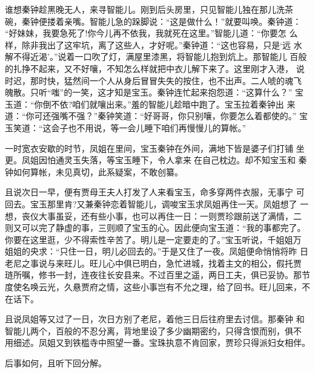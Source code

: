 谁想秦钟趁黑晚无人，来寻智能儿。刚到后头房里，只见智能儿独在那儿洗茶
碗，秦钟便搂着亲嘴。智能儿急的跺脚说：“这是做什么！”就要叫唤。秦钟道：
“好妹妹，我要急死了!你今儿再不依我，我就死在这里。”智能儿道：“你要怎
么样，除非我出了这牢坑，离了这些人，才好呢。”秦钟道：“这也容易，只是‘远
水解不得近渴’。”说着一口吹了灯，满屋里漆黑，将智能儿抱到炕上。那智能儿
百般的扎挣不起来，又不好嚷，不知怎么样就把中衣儿解下来了。这里刚才入港，
说时迟，那时快，猛然间一个人从身后冒冒失失的按住，也不出声。二人唬的魂飞
魄散。只听“嗤”的一笑，这才知是宝玉。秦钟连忙起来抱怨道：“这算什么？”
宝玉道：“你倒不依?咱们就嚷出来。”羞的智能儿趁暗中跑了。宝玉拉着秦钟出
来道：“你可还强嘴不强？”秦钟笑道：“好哥哥，你只别嚷，你要怎么着都使的。”
宝玉笑道：“这会子也不用说，等一会儿睡下咱们再慢慢儿的算帐。”

一时宽衣安歇的时节，凤姐在里间，宝玉秦钟在外间，满地下皆是婆子们打铺
坐更。凤姐因怕通灵玉失落，等宝玉睡下，令人拿来在自己枕边。却不知宝玉和
秦钟如何算帐，未见真切，此系疑案，不敢创纂。

且说次日一早，便有贾母王夫人打发了人来看宝玉，命多穿两件衣服，无事宁
可回去。宝玉那里肯?又兼秦钟恋着智能儿，调唆宝玉求凤姐再住一天。凤姐想了
一想，丧仪大事虽妥，还有些小事，也可以再住一日：一则贾珍跟前送了满情，二
则又可以完了静虚的事，三则顺了宝玉的心。因此便向宝玉道：“我的事都完了。
你要在这里逛，少不得索性辛苦了。明儿是一定要走的了。”宝玉听说，千姐姐万
姐姐的央求：“只住一日，明儿必回去的。”于是又住了一夜。凤姐便命悄悄将昨
日老尼之事说与来旺儿。旺儿心中俱已明白，急忙进城，找着主文的相公，假托贾
琏所嘱，修书一封，连夜往长安县来。不过百里之遥，两日工夫，俱已妥协。那节
度使名唤云光，久悬贾府之情，这些小事岂有不允之理，给了回书。旺儿回来，不
在话下。

且说凤姐等又过了一日，次日方别了老尼，着他三日后往府里去讨信。那秦钟
和智能儿两个，百般的不忍分离，背地里设了多少幽期密约，只得含恨而别，俱不
用细述。凤姐又到铁槛寺中照望一番。宝珠执意不肯回家，贾珍只得派妇女相伴。

后事如何，且听下回分解。